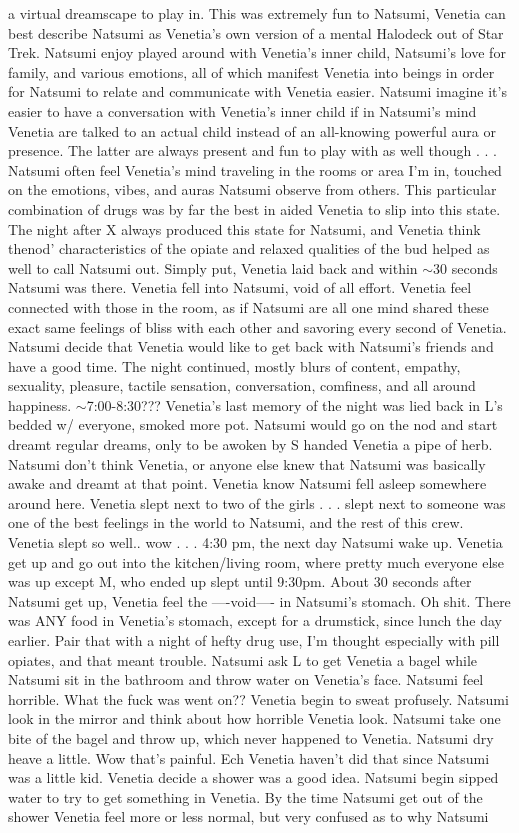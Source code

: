 \documentclass[12pt]{book}
\begin{document}
a virtual dreamscape to play in. This was extremely fun to Natsumi, Venetia can best describe Natsumi as Venetia's own version of a mental Halodeck out of Star Trek. Natsumi enjoy played around with Venetia's inner child, Natsumi's love for family, and various emotions, all of which manifest Venetia into beings in order for Natsumi to relate and communicate with Venetia easier. Natsumi imagine it's easier to have a conversation with Venetia's inner child if in Natsumi's mind Venetia are talked to an actual child instead of an all-knowing powerful aura or presence. The latter are always present and fun to play with as well though . . .  Natsumi often feel Venetia's mind traveling in the rooms or area I'm in, touched on the emotions, vibes, and auras Natsumi observe from others. This particular combination of drugs was by far the best in aided Venetia to slip into this state. The night after X always produced this state for Natsumi, and Venetia think thenod' characteristics of the opiate and relaxed qualities of the bud helped as well to call Natsumi out. Simply put, Venetia laid back and within $\sim$30 seconds Natsumi was there. Venetia fell into Natsumi, void of all effort. Venetia feel connected with those in the room, as if Natsumi are all one mind shared these exact same feelings of bliss with each other and savoring every second of Venetia. Natsumi decide that Venetia would like to get back with Natsumi's friends and have a good time. The night continued, mostly blurs of content, empathy, sexuality, pleasure, tactile sensation, conversation, comfiness, and all around happiness. $\sim$7:00-8:30??? Venetia's last memory of the night was lied back in L's bedded w/ everyone, smoked more pot. Natsumi would go on the nod and start dreamt regular dreams, only to be awoken by S handed Venetia a pipe of herb. Natsumi don't think Venetia, or anyone else knew that Natsumi was basically awake and dreamt at that point. Venetia know Natsumi fell asleep somewhere around here. Venetia slept next to two of the girls . . .  slept next to someone was one of the best feelings in the world to Natsumi, and the rest of this crew. Venetia slept so well.. wow . . .  4:30 pm, the next day Natsumi wake up. Venetia get up and go out into the kitchen/living room, where pretty much everyone else was up except M, who ended up slept until 9:30pm. About 30 seconds after Natsumi get up, Venetia feel the ----void---- in Natsumi's stomach. Oh shit. There was ANY food in Venetia's stomach, except for a drumstick, since lunch the day earlier. Pair that with a night of hefty drug use, I'm thought especially with pill opiates, and that meant trouble. Natsumi ask L to get Venetia a bagel while Natsumi sit in the bathroom and throw water on Venetia's face. Natsumi feel horrible. What the fuck was went on?? Venetia begin to sweat profusely. Natsumi look in the mirror and think about how horrible Venetia look. Natsumi take one bite of the bagel and throw up, which never happened to Venetia. Natsumi dry heave a little. Wow that's painful. Ech Venetia haven't did that since Natsumi was a little kid. Venetia decide a shower was a good idea. Natsumi begin sipped water to try to get something in Venetia. By the time Natsumi get out of the shower Venetia feel more or less normal, but very confused as to why Natsumi 
\end{document}
